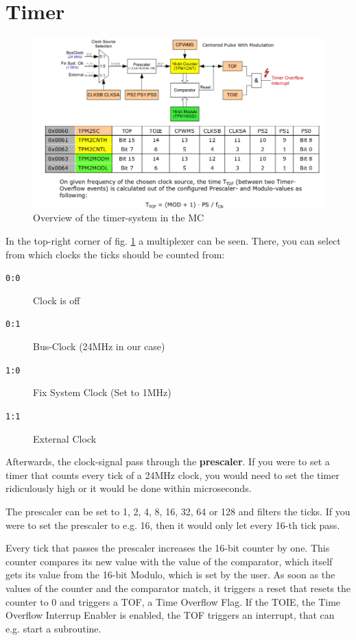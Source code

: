 \documentclass[a4paper, 11pt, nofootinbib]{article}
\newcommand{\code}[1]{\texttt{#1}}
\begin{document}
\section{Timer}
\begin{figure}[htb]
	\centering
	\includegraphics[keepaspectratio=true,height=15\baselineskip]{timer.jpg}
	\caption{Overview of the timer-system in the MC}
	\label{fig:timer}
\end{figure}


In the top-right corner of fig. \ref{fig:timer} a multiplexer can be seen. There, you can select from which clocks the ticks should be counted from:
\begin{multicols}{2}
	\begin{description}
		\item[\code{0:0}] Clock is off
		\item[\code{0:1}] Bus-Clock (24MHz in our case)
		\item[\code{1:0}] Fix System Clock (Set to 1MHz)
		\item[\code{1:1}] External Clock
	\end{description}
\end{multicols}

Afterwards, the clock-signal pass through the \textbf{prescaler}. If you were to set a timer that counts every tick of a 24MHz clock, you would need to set the timer ridiculously high or it would be done within microseconds.

The prescaler can be set to 1, 2, 4, 8, 16, 32, 64 or 128 and filters the ticks. If you were to set the prescaler to e.g. 16, then it would only let every 16-th tick pass. 

Every tick that passes the prescaler increases the 16-bit counter by one. This counter compares its new value with the value of the comparator, which itself gets its value from the 16-bit Modulo, which is set by the user. As soon as the values of the counter and the comparator match, it triggers a reset that resets the counter to 0 and triggers a TOF, a Time Overflow Flag. If the TOIE, the Time Overflow Interrup Enabler is enabled, the TOF triggers an interrupt, that can e.g. start a subroutine.
\end{document}
